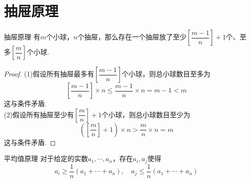 \documentclass[lang=cn, zihao=4.5]{elegantbook}
\newcommand{\ssb}[1]{\left( #1 \right)}
\begin{document}
\section{抽屉原理}

\begin{theorem}{抽屉原理}
	有$m$个小球，$n$个抽屉，那么存在一个抽屉放了至少$\left[ \dfrac{m-1}{n} \right]+1$个、至多$\left[ \dfrac{m}{n} \right]$个小球.
\end{theorem}
\begin{proof}
	(1)假设所有抽屉最多有$\left[ \dfrac{m-1}{n} \right]$个小球，则总小球数目至多为$$\left[ \frac{m-1}{n} \right] \times n \leq \frac{m-1}{n} \times n = m-1 < m$$
	这与条件矛盾. \\
	(2)假设所有抽屉至少有$\left[ \dfrac{m}{n} \right] + 1$个小球，则总小球数目至少为$$\ssb{\left[ \dfrac{m}{n} \right] + 1} \times n > \frac{m}{n} \times n = m$$
	这与条件矛盾.
\end{proof}

\begin{corollary}{平均值原理}
	对于给定的实数$a_1, \cdots ,a_n$，存在$a_i,a_j$使得$$a_i \geq \dfrac{1}{n}(a_1+ \cdots +a_n), \quad a_j \leq \dfrac{1}{n}(a_1+ \cdots +a_n)$$
\end{corollary}
\end{document}
